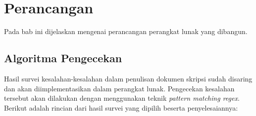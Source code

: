 \chapter{Perancangan}
\label{chap:Perancangan}

Pada bab ini dijelaskan mengenai perancangan perangkat lunak yang dibangun.

\section{Algoritma Pengecekan}

Hasil survei kesalahan-kesalahan dalam penulisan dokumen skripsi sudah disaring dan akan diimplementasikan dalam perangkat lunak. Pengecekan kesalahan tersebut akan dilakukan dengan menggunakan teknik \textit{pattern matching regex}. Berikut adalah rincian dari hasil survei yang dipilih beserta penyelesaiannya:

